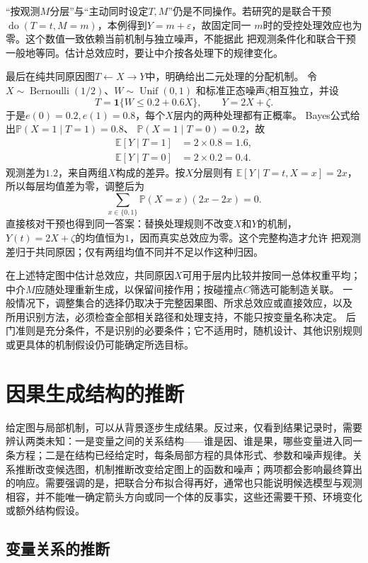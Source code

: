 “按观测\(M\)分层”与“主动同时设定\(T,M\)”仍是不同操作。若研究的是联合干预
\(\operatorname{do}(T=t,M=m)\)，本例得到\(Y=m+\varepsilon\)，故固定同一
\(m\)时的受控处理效应也为零。这个数值一致依赖当前机制与独立噪声，不能据此
把观测条件化和联合干预一般地等同。估计总效应时，要让中介按各处理下的规律变化。

最后在纯共同原因图\(T\leftarrow X\to Y\)中，明确给出二元处理的分配机制。
令\(X\sim\operatorname{Bernoulli}(1/2)\)、\(W\sim\operatorname{Unif}(0,1)\)
和标准正态噪声\(\zeta\)相互独立，并设
\[
  T=\mathbf 1\{W\leq0.2+0.6X\},\qquad Y=2X+\zeta.
\]
于是\(e(0)=0.2,e(1)=0.8\)，每个\(X\)层内的两种处理都有正概率。
Bayes公式给出\(\mathbb P(X=1\mid T=1)=0.8\)、
\(\mathbb P(X=1\mid T=0)=0.2\)，故
\[
  \begin{aligned}
    \mathbb E[Y\mid T=1]&=2\times0.8=1.6,\\
    \mathbb E[Y\mid T=0]&=2\times0.2=0.4.
  \end{aligned}
\]
观测差为\(1.2\)，来自两组\(X\)构成的差异。按\(X\)分层则有
\(\mathbb E[Y\mid T=t,X=x]=2x\)，所以每层均值差为零，调整后为
\[
  \sum_{x\in\{0,1\}}\mathbb P(X=x)(2x-2x)=0.
\]
直接核对干预也得到同一答案：替换处理规则不改变\(X\)和\(Y\)的机制，
\(Y(t)=2X+\zeta\)的均值恒为\(1\)，因而真实总效应为零。这个完整构造才允许
把观测差归于共同原因；仅有两组均值不同并不足以作这种归因。

在上述特定图中估计总效应，共同原因\(X\)可用于层内比较并按同一总体权重平均；
中介\(M\)应随处理重新生成，以保留间接作用；按碰撞点\(C\)筛选可能制造关联。
一般情况下，调整集合的选择仍取决于完整因果图、所求总效应或直接效应，以及
所用识别方法，必须检查全部相关路径和处理支持，不能只按变量名称决定。
后门准则是充分条件，不是识别的必要条件；它不适用时，随机设计、其他识别规则
或更具体的机制假设仍可能确定所选目标。

\section{因果生成结构的推断}
\label{sec:causal-structure-discovery}

给定图与局部机制，可以从背景逐步生成结果。反过来，仅看到结果记录时，需要辨认两类未知：一是变量之间的关系结构——谁是因、谁是果，哪些变量进入同一条方程；二是在结构已经给定时，每条局部方程的具体形式、参数和噪声规律。关系推断改变候选图，机制推断改变给定图上的函数和噪声；两项都会影响最终算出的响应。需要强调的是，把联合分布拟合得再好，通常也只能说明候选模型与观测相容，并不能唯一确定箭头方向或同一个体的反事实，这些还需要干预、环境变化或额外结构假设。

\subsection{变量关系的推断}
\label{sec:causal-relation-inference}

